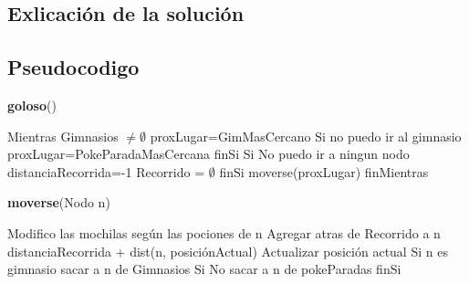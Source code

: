 \documentclass[spanish,12pt]{article}
\begin{document}
\subsection{Exlicación de la solución}



\subsection{Pseudocodigo}

\begin{algorithm}[H]{\textbf{goloso}()}
	\begin{algorithmic}[1]
		\State Mientras Gimnasios $\not= \emptyset$
		\State \quad proxLugar=GimMasCercano
		\State \quad Si no puedo ir al gimnasio
		\State \qquad proxLugar=PokeParadaMasCercana
		\State \quad finSi
		\State \quad Si No puedo ir a ningun nodo 
		\State \qquad distanciaRecorrida=-1
		\State \qquad Recorrido = $\emptyset$
		\State \quad finSi
		\State \quad moverse(proxLugar)
		\State finMientras
	\end{algorithmic}
\end{algorithm}

\begin{algorithm}[H]{\textbf{moverse}(Nodo n)}
	\begin{algorithmic}[1]
		\State Modifico las mochilas según las pociones de n
		\State Agregar atras de Recorrido a n
		\State distanciaRecorrida + dist(n, posiciónActual)
		\State Actualizar posición actual
		\State Si n es gimnasio
		\State \quad sacar a n de Gimnasios
		\State Si No
		\State \quad sacar a n de pokeParadas
		\State finSi
	\end{algorithmic}
\end{algorithm}
\end{document}
